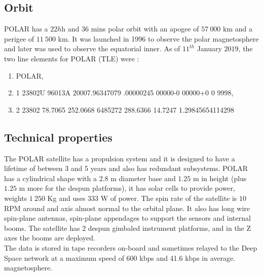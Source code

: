 \documentclass[a4paper,12pt,calibri,oneside,openany]{book}
\theoremstyle{break}
\begin{document}
\subsection{Orbit}
POLAR has a $22h$h and $36$ mins polar orbit with an apogee of $57\ 000$ km and a perigee of $11\ 500$ km. It was launched in 1996 to observe the polar magnetosphere and later was used to observe the equatorial inner. As of $11^{th}$ January $2019$, the two line elements for POLAR (TLE) were :\\

\begin{enumerate}
	\item POLAR,                  
	\item 1 23802U 96013A   20007.96347079  .00000245  00000-0  00000+0 0  9998,
	\item 2 23802  78.7065 252.0668 6485272 288.6366  14.7247  1.29845654114298
\end{enumerate}

\subsection{Technical properties}
The POLAR satellite has a propulsion system and it is designed to have a lifetime of between 3 and 5 years and also has redundant subsystems. POLAR has a cylindrical shape with a $2.8$ m diameter base and $1.25$ m in height (plus $1.25$ m more for the despun platforms), it has solar cells to provide power, weights $1\ 250$ Kg and uses $333$ W of power. The spin rate of the satellite is $10$ RPM around and axis almost normal to the orbital plane. It also has long wire spin-plane antennas, spin-plane appendages to support the sensors and internal booms. The satellite has 2 despun gimbaled instrument platforms, and in the Z axes the booms are deployed.\\

The data is stored in tape recorders on-board and sometimes relayed to the Deep Space network at a maximum speed of 600 kbps and 41.6 kbps in average.\\
 magnetosphere.
 \newpage
\end{document}
